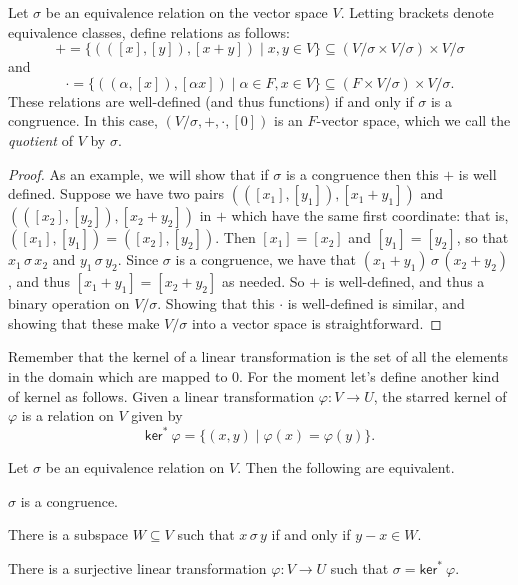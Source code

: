 \documentclass{memoir}
\begin{document}
\begin{prp}
Let $\sigma$ be an equivalence relation on the vector space $V$. Letting brackets denote equivalence classes, define relations as follows: \[ + = \{ (([x], [y]), [x+y]) \mid x,y \in V \} \subseteq (V/\sigma \times V/\sigma) \times V/\sigma \] and \[ \cdot = \{ ((\alpha, [x]), [\alpha x]) \mid \alpha \in F, x \in V \} \subseteq (F \times V/\sigma) \times V/\sigma. \] These relations are well-defined (and thus functions) if and only if $\sigma$ is a congruence. In this case, $(V/\sigma, +, \cdot, [0])$ is an $F$-vector space, which we call the \emph{quotient} of $V$ by $\sigma$.
\end{prp}

\begin{proof}
As an example, we will show that if $\sigma$ is a congruence then this $+$ is well defined. Suppose we have two pairs $(([x_1],[y_1]),[x_1+y_1])$ and $(([x_2],[y_2]),[x_2+y_2])$ in $+$ which have the same first coordinate: that is, $([x_1],[y_1]) = ([x_2],[y_2])$. Then $[x_1] = [x_2]$ and $[y_1] = [y_2]$, so that $x_1 \,\sigma\, x_2$ and $y_1 \,\sigma\, y_2$. Since $\sigma$ is a congruence, we have that $(x_1+y_1) \,\sigma\, (x_2+y_2)$, and thus $[x_1+y_1] = [x_2+y_2]$ as needed. So $+$ is well-defined, and thus a binary operation on $V/\sigma$. Showing that this $\cdot$ is well-defined is similar, and showing that these make $V/\sigma$ into a vector space is straightforward.
\end{proof}

Remember that the kernel of a linear transformation is the set of all the elements in the domain which are mapped to 0. For the moment let's define another kind of kernel as follows. Given a linear transformation $\varphi : V \rightarrow U$, the starred kernel of $\varphi$ is a relation on $V$ given by \[ \mathsf{ker}^\ast\ \varphi = \{ (x,y) \mid \varphi(x) = \varphi(y) \}. \]

\begin{prp}
Let $\sigma$ be an equivalence relation on $V$. Then the following are equivalent.
\begin{enumerate*}
\item $\sigma$ is a congruence.
\item There is a subspace $W \subseteq V$ such that $x \,\sigma\, y$ if and only if $y-x \in W$.
\item There is a surjective linear transformation $\varphi : V \rightarrow U$ such that $\sigma = \mathsf{ker}^\ast\ \varphi$.
\end{enumerate*}
\end{prp}
\end{document}
